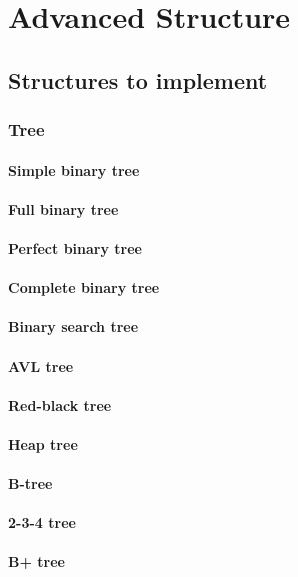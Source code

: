 \section{Advanced Structure}


\subsection{Structures to implement}

\subsubsection{Tree}

\paragraph{Simple binary tree}
\paragraph{Full binary tree }
\paragraph{Perfect binary tree}
\paragraph{Complete binary tree}
\paragraph{Binary search tree}
\paragraph{AVL tree}
\paragraph{Red-black tree}
\paragraph{Heap tree}
\paragraph{B-tree}
\paragraph{ 2-3-4 tree}
\paragraph{B+ tree}


